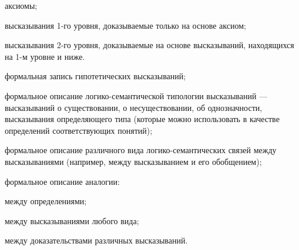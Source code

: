 \begin{SCn}
\begin{scnsubstruct}
\begin{scnsubstruct}
{\begin{scnitemize}
                    \begin{scnitemizeii}
                        \item аксиомы;
                        \item высказывания 1-го уровня, доказываемые только на основе аксиом;
                        \item высказывания 2-го уровня, доказываемые на основе высказываний, находящихся на 1-м уровне и ниже.
                    \end{scnitemizeii}
                    \item формальная запись гипотетических высказываний;
                    \item формальное описание логико-семантической типологии высказываний --- высказываний о существовании, о несуществовании, об однозначности, высказывания определяющего типа (которые можно использовать в качестве определений соответствующих понятий);
                    \item формальное описание различного вида логико-семантических связей между высказываниями (например, между высказыванием и его обобщением);
                    \item формальное описание аналогии:
                    \begin{scnitemizeii}
                        \item между определениями;
                        \item между высказываниями любого вида;
                        \item между доказательствами различных высказываний.
                    \end{scnitemizeii}
                \end{scnitemize}}
            
            

\end{scnsubstruct}
\end{scnsubstruct}
\end{SCn}
